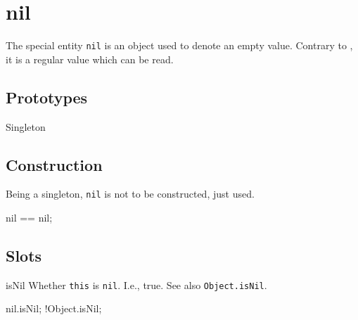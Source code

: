 \section{nil}

The special entity \lstinline|nil| is an object used to denote an
empty value.  Contrary to , it is a regular value
which can be read.

\subsection{Prototypes}

\begin{refObjects}
\item[Singleton]
\end{refObjects}

\subsection{Construction}

Being a singleton, \lstinline|nil| is not to be constructed, just used.

\begin{urbiassert}[firstnumber=1]
nil == nil;
\end{urbiassert}

\subsection{Slots}

\begin{urbiscriptapi}
\item[isNil]
  Whether \lstinline|this| is \lstinline|nil|.  I.e., true.  See also
  \lstinline|Object.isNil|.
\begin{urbiassert}
nil.isNil;
!Object.isNil;
\end{urbiassert}

\end{urbiscriptapi}

